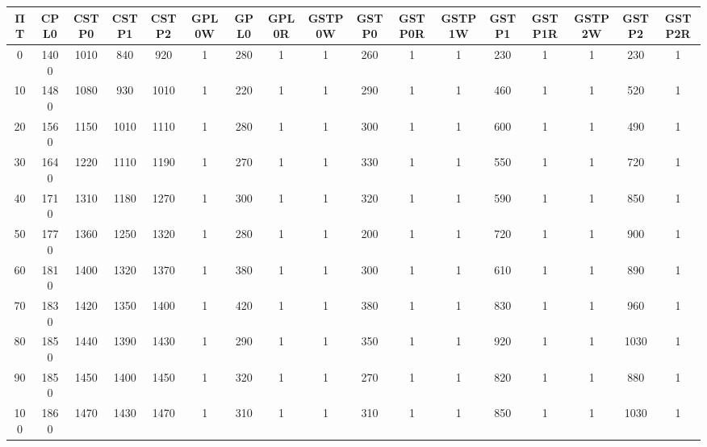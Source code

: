 \begin{tabular}{|c|c|c|c|c|c|c|c|c|c|c|c|c|c|c|c|c|}
\hline
ΠΤ&CPL0&CSTP0&CSTP1&CSTP2&GPL0W&GPL0&GPL0R&GSTP0W&GSTP0&GSTP0R&GSTP1W&GSTP1&GSTP1R&GSTP2W&GSTP2&GSTP2R\\\hline
\hline
0&1400&1010&840&920&1&280&1&1&260&1&1&230&1&1&230&1\\
\hline
10&1480&1080&930&1010&1&220&1&1&290&1&1&460&1&1&520&1\\
\hline
20&1560&1150&1010&1110&1&280&1&1&300&1&1&600&1&1&490&1\\
\hline
30&1640&1220&1110&1190&1&270&1&1&330&1&1&550&1&1&720&1\\
\hline
40&1710&1310&1180&1270&1&300&1&1&320&1&1&590&1&1&850&1\\
\hline
50&1770&1360&1250&1320&1&280&1&1&200&1&1&720&1&1&900&1\\
\hline
60&1810&1400&1320&1370&1&380&1&1&300&1&1&610&1&1&890&1\\
\hline
70&1830&1420&1350&1400&1&420&1&1&380&1&1&830&1&1&960&1\\
\hline
80&1850&1440&1390&1430&1&290&1&1&350&1&1&920&1&1&1030&1\\
\hline
90&1850&1450&1400&1450&1&320&1&1&270&1&1&820&1&1&880&1\\
\hline
100&1860&1470&1430&1470&1&310&1&1&310&1&1&850&1&1&1030&1\\
\hline
\end{tabular}
